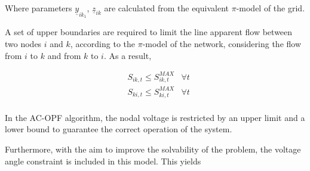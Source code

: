  
Where parameters $\underline{y}_{ik_1}$,  $\underline{z}_{ik}$ are calculated from the equivalent $\pi$-model of the grid.  
%

A set of upper boundaries are required to limit the line apparent flow between two nodes $i$ and $k$, according to the $\pi$-model of the network, considering the flow from $i$ to $k$ and from $k$ to $i$. As a result, 

\begin{subequations}
\begin{align*}
&  S_{ik,t} \leq S_{ik,t}^{MAX}  &\forall t  \\
&  S_{ki,t} \leq S_{ki,t}^{MAX}  &\forall t  \\ 
\end{align*}
\end{subequations}

In the AC-OPF algorithm, the nodal voltage is restricted by an upper limit and a lower bound to guarantee the correct operation of the system.

Furthermore, with the aim to improve the solvability of the problem, the voltage angle constraint is included in this model. This yields 


%


